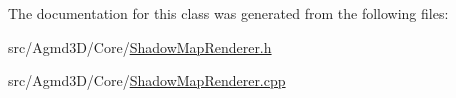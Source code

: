 The documentation for this class was generated from the following files\+:\begin{DoxyCompactItemize}
\item 
src/\+Agmd3\+D/\+Core/\hyperlink{_shadow_map_renderer_8h}{Shadow\+Map\+Renderer.\+h}\item 
src/\+Agmd3\+D/\+Core/\hyperlink{_shadow_map_renderer_8cpp}{Shadow\+Map\+Renderer.\+cpp}\end{DoxyCompactItemize}
